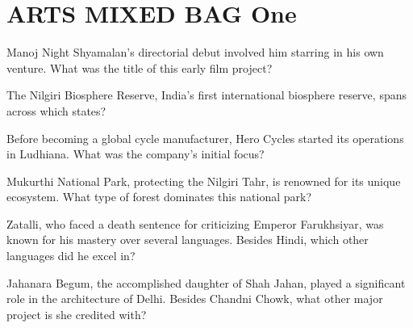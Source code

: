 \documentclass[12pt,a4paper]{book}
\begin{document}
\section{ARTS MIXED BAG One}

\begin{enhancedmcq}[Question 1]{Manoj Night Shyamalan's directorial debut involved him starring in his own venture. What was the title of this early film project?}
\end{enhancedmcq}

\begin{enhancedmcq}[Question 2]{The Nilgiri Biosphere Reserve, India's first international biosphere reserve, spans across which states?}
\end{enhancedmcq}

\begin{enhancedmcq}[Question 3]{Before becoming a global cycle manufacturer, Hero Cycles started its operations in Ludhiana. What was the company's initial focus?}
\end{enhancedmcq}

\begin{enhancedmcq}[Question 4]{Mukurthi National Park, protecting the Nilgiri Tahr, is renowned for its unique ecosystem. What type of forest dominates this national park?}
\end{enhancedmcq}

\begin{enhancedmcq}[Question 5]{Zatalli, who faced a death sentence for criticizing Emperor Farukhsiyar, was known for his mastery over several languages. Besides Hindi, which other languages did he excel in?}
\end{enhancedmcq}

\begin{enhancedmcq}[Question 6]{Jahanara Begum, the accomplished daughter of Shah Jahan, played a significant role in the architecture of Delhi. Besides Chandni Chowk, what other major project is she credited with?}
\end{enhancedmcq}
\end{document}
